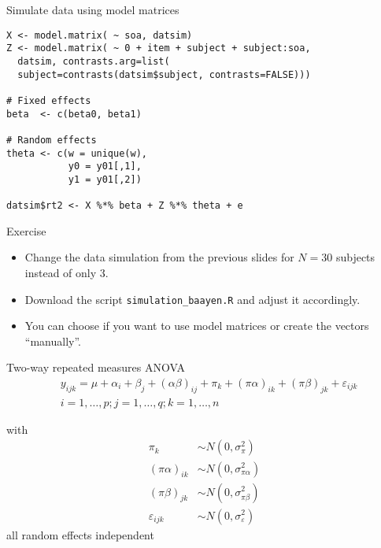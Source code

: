 \documentclass{beamer}
\begin{document}
{

\begin{frame}[fragile]{Simulate data using model matrices}
  \begin{lstlisting}
X <- model.matrix( ~ soa, datsim)
Z <- model.matrix( ~ 0 + item + subject + subject:soa,
  datsim, contrasts.arg=list(
  subject=contrasts(datsim$subject, contrasts=FALSE)))

# Fixed effects
beta  <- c(beta0, beta1)

# Random effects
theta <- c(w = unique(w),
           y0 = y01[,1],
           y1 = y01[,2])

datsim$rt2 <- X %*% beta + Z %*% theta + e
  \end{lstlisting}
\end{frame}

}

\begin{frame}[fragile]{}
  \begin{block}{Exercise}
    \begin{itemize}
      \item Change the data simulation from the previous slides for $N =
        30$ subjects instead of only 3.
      \item Download the script \verb+simulation_baayen.R+ and adjust it
        accordingly.
      \item You can choose if you want to use model matrices or create
        the vectors ``manually''.
    \end{itemize}
  \end{block}
\end{frame}


\begin{frame}{Two-way repeated measures ANOVA}
  \begin{align*}
    &   y_{ijk} = \mu + \alpha_i + \beta_j + (\alpha\beta)_{ij} + \pi_k +
        (\pi\alpha)_{ik} + (\pi\beta)_{jk} + \varepsilon_{ijk}\\
    &  i = 1,\dots,p; j = 1,\dots,q; k = 1,\dots,n
  \end{align*}

     with
  \begin{align*}
    \pi_k & \sim N(0, \sigma^2_{\pi})\\
    (\pi\alpha)_{ik} & \sim N(0, \sigma^2_{\pi\alpha})\\
    (\pi\beta)_{jk} & \sim N(0, \sigma^2_{\pi\beta})\\
    \varepsilon_{ijk} & \sim N(0, \sigma^2_{\varepsilon})
  \end{align*}
     all random effects independent
\vfill
\end{frame}
\end{document}
